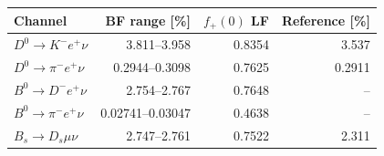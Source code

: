 \begin{tabular}{lrrr}
\toprule
Channel & BF range [\%] & $f_+(0)$ LF & Reference [\%] \\
\midrule
$D^0\to K^-e^+\nu$ & 3.811--3.958 & 0.8354 & 3.537 \\
$D^0\to\pi^-e^+\nu$ & 0.2944--0.3098 & 0.7625 & 0.2911 \\
$B^0\to D^-e^+\nu$ & 2.754--2.767 & 0.7648 & -- \\
$B^0\to\pi^-e^+\nu$ & 0.02741--0.03047 & 0.4638 & -- \\
$B_s\to D_s\mu\nu$ & 2.747--2.761 & 0.7522 & 2.311 \\
\bottomrule
\end{tabular}
